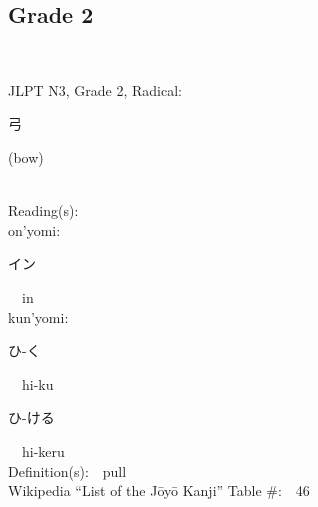 \newpage



\subsection*{Grade 2 }
  \label{P1-2}
\begin{multicols}{2}
{\fontsize{34pt}{40pt}  }\ \ \\  %
{JLPT N3, Grade 2, Radical:\ \ {\begin{CJK}{UTF8}{min} 弓 \end{CJK}} (bow) } \\
Reading(s):\ \ \\
{\hspace*{1em}}on'yomi:\ \ \\
{\hspace*{2em}}{\begin{CJK}{UTF8}{min} イン \end{CJK}}\ \ in\ \ \\
{\hspace*{1em}}kun'yomi:\ \ \\
{\hspace*{2em}}{\begin{CJK}{UTF8}{min} ひ-く \end{CJK}}\ \ hi-ku\ \ \\
{\hspace*{2em}}{\begin{CJK}{UTF8}{min} ひ-ける \end{CJK}}\ \ hi-keru\ \ \\
Definition(s):\ \ pull \\
Wikipedia ``List of the J\=oy\=o Kanji'' Table \#:\ \ 46 \\
\ \ \\
{\fontsize{34pt}{40pt}  }\ \ \\  %

\end{multicols}
